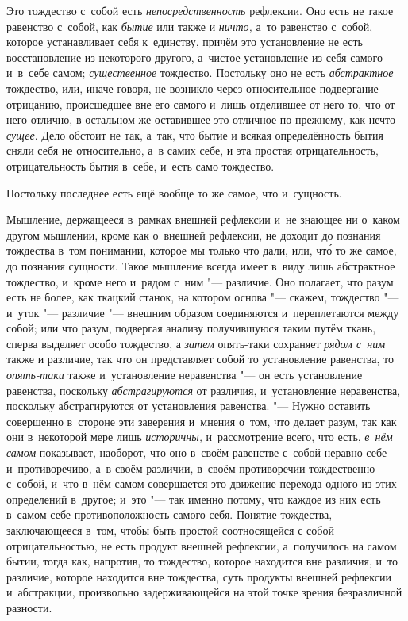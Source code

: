 Это тождество с~собой есть {\em непосредственность}
рефлексии. Оно есть не такое равенство с~собой, как
{\em бытие} или также и
{\em ничто,} а~то равенство с~собой, которое
устанавливает себя к~единству, причём это установление не есть
восстановление из некоторого другого, а~чистое установление из себя самого
и~в~себе самом; {\em существенное} тождество. Постольку
оно не есть {\em абстрактное} тождество, или, иначе
говоря, не возникло через относительное подвергание отрицанию, происшедшее
вне его самого и~лишь отделившее от него то, что от него отлично, в
остальном же оставившее это отличное по-прежнему, как нечто
{\em сущее}. Дело обстоит не так, а~так, что бытие и
всякая определённость бытия сняли себя не относительно, а~в самих себе, и
эта простая отрицательность, отрицательность бытия в~себе, и~есть само
тождество.

Постольку последнее есть ещё вообще то же самое, что и~сущность.


Мышление, держащееся в~рамках внешней рефлексии и~не знающее ни о~каком
другом мышлении, кроме как о~внешней рефлексии, не доходит до познания
тождества в~том понимании, которое мы только что дали, или, чт\'{о} то же
самое, до познания сущности. Такое мышление всегда имеет в~виду лишь
абстрактное тождество, и~кроме него и~рядом с~ним "--- различие. Оно полагает,
что разум есть не более, как ткацкий станок, на котором основа "--- скажем,
тождество "--- и~уток "--- различие "--- внешним образом соединяются и~переплетаются
между собой; или что разум, подвергая анализу получившуюся таким путём
ткань, сперва выделяет особо тождество, а {\em затем}
опять-таки сохраняет {\em рядом с~ним} также и
различие, так что он представляет собой то установление равенства, то
{\em опять-таки} также и~установление неравенства "--- он
есть установление равенства, поскольку
{\em абстрагируются} от различия, и~установление
неравенства, поскольку абстрагируются от установления равенства. "--- Нужно
оставить совершенно в~стороне эти заверения и~мнения о~том, что делает
разум, так как они в~некоторой мере лишь
{\em историчны,} и~рассмотрение всего, что есть,
{\em в~нём самом} показывает, наоборот, что оно в~своём
равенстве с~собой неравно себе и~противоречиво, а~в своём различии, в~своём
противоречии тождественно с~собой, и~что в~нём самом совершается это
движение перехода одного из этих определений в~другое; и~это "--- так именно
потому, что каждое из них есть в~самом себе противоположность самого себя.
Понятие тождества, заключающееся в~том, чтобы быть простой соотносящейся с
собой отрицательностью, не есть продукт внешней рефлексии, а~получилось на
самом бытии, тогда как, напротив, то тождество, которое находится вне
различия, и~то различие, которое находится вне тождества, суть продукты
внешней рефлексии и~абстракции, произвольно задерживающейся на этой точке
зрения безразличной разности.

